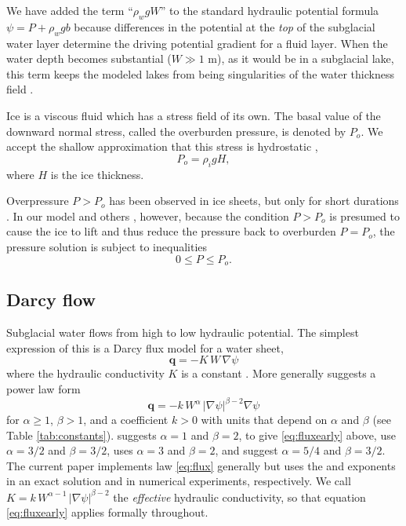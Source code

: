 \documentclass[gmd]{copernicus}   %
\newcommand\bq{\mathbf{q}}
\newcommand{\grad}{\nabla}
\begin{document}
We have added the term ``$\rho_w g W$'' to the standard hydraulic potential formula $\psi = P + \rho_w g b$ \citep{Clarke05,Shreve1972} because differences in the potential at the \emph{top} of the subglacial water layer determine the driving potential gradient for a fluid layer.  When the water depth becomes substantial ($W\gg 1$ m), as it would be in a subglacial lake, this term keeps the modeled lakes from being singularities of the water thickness field \citep[compare][]{LeBrocqetal2009}.

Ice is a viscous fluid which has a stress field of its own.  The basal value of the downward normal stress, called the overburden pressure, is denoted by $P_o$.  We accept the shallow approximation that this stress is hydrostatic \citep{GreveBlatter2009},
\begin{equation} \label{eq:hydrostatic}
  P_o = \rho_i g H,
\end{equation}
where $H$ is the ice thickness.

Overpressure $P>P_o$ has been observed in ice sheets, but only for short durations \citep{Dasetal08}.  In our model and others \citep{Schoofetal2012}, however, because the condition $P>P_o$ is presumed to cause the ice to lift and thus reduce the pressure back to overburden $P=P_o$, the pressure solution is subject to inequalities
\begin{equation}
0 \le P \le P_o. \label{eq:bounds}
\end{equation}

\subsection{Darcy flow}  \label{subsec:darcy}  Subglacial water flows from high to low hydraulic potential.  The simplest expression of this is a Darcy flux model for a water sheet,
\begin{equation}  \label{eq:fluxearly}
\bq = - K \,W\, \grad \psi
\end{equation}
where the hydraulic conductivity $K$ is a constant \citep{Clarke05}.  More generally \cite{Schoofetal2012} suggests a power law form
\begin{equation}  \label{eq:flux}
\bq = - k\, W^\alpha\, |\grad \psi|^{\beta-2} \grad \psi
\end{equation}
for $\alpha \ge 1$, $\beta>1$, and a coefficient $k>0$ with units that depend on $\alpha$ and $\beta$ (see Table \ref{tab:constants}).  \cite{Clarke05} suggests $\alpha=1$ and $\beta=2$, to give \eqref{eq:fluxearly} above, \cite{CreytsSchoof2009} use $\alpha=3/2$ and $\beta=3/2$, \cite{Hewitt2011,Hewitt2013} uses $\alpha=3$ and $\beta = 2$, and \cite{Hewittetal2012} suggest $\alpha=5/4$ and $\beta=3/2$.  The current paper implements law \eqref{eq:flux} generally but uses the \cite{Clarke05} and \cite{Hewittetal2012} exponents in an exact solution and in numerical experiments, respectively.  We call $K = k\, W^{\alpha-1}\, |\grad \psi|^{\beta-2}$ the \emph{effective} hydraulic conductivity, so that equation \eqref{eq:fluxearly} applies formally throughout.
\end{document}
